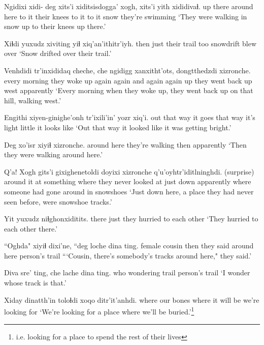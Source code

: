 \documentclass[12pt]{article}
\begin{document}
\gll Ngidixi  xidi- deg         xits'i xiditsisdogga' xogh, xits'i yith xididivaɬ.
{up there}  {}     {around here} {to it}  {their knees} {to it} {to it}  snow {they're swimming}
\glt `They were walking in snow up to their knees up there.'
\glend

\gll Xiɬdi yuxudz xiviting    yiɬ xiq'an'ithitr'iyh. 
then  just   {their trail} too {snowdrift blew over}
\glt `Snow drifted over their trail.'
\glend

\gll Venhdidi      tr'inxididaq cheche, che   ngidigg xanxitht'ots, dongtthedzdi xizronche.
{every morning} {they woke up again} {again and again}  again up      {they went back up} west  apparently
\glt `Every morning when they woke up, they went back up on that hill, walking west.'
\glend

\gll Engithi       xiyen-ginighe'onh    tr'ixili'in' yozr   xiq'i.
{out that way} {it goes that way} {it's light}   little {it looks like}
\glt `Out that way it looked like it was getting bright.'
\glend

\gll Deg         xo'isr          xiyiɬ xizronche.
{around here} {they're walking} then apparently
\glt `Then they were walking around here.'
\glend

\gll Q'a! Xogh      gits'i       gixighenetoldi       doyixi    xizronche q'u'oyhtr'iditlninghdi.
(surprise) {around it} {at something} {where they never looked at} {just down}  apparently   {where someone had gone around in snowshoes}
\glt `Just down here, a place they had never seen before, were snowshoe tracks.'
\glend

\gll Yit   yuxudz niɬghonxiditits.
there just   {they hurried to each other}
\glt `They hurried to each other there.'
\glend

\gll ``Oghda" xiyiɬ dixi'ne,  ``deg         loche dina     ting.
{female cousin}  then  {they said}  {around here}    {}   person's trail
\glt ```Cousin, there's somebody's tracks around here," they said.'
\glend

\gll Diva sre'      ting, che lache dina     ting.
who  wondering trail    {}  {}     person's trail
\glt `I wonder whose track is that.'
\glend

\gll Xiday dinatth'in toloɬdi       {xoqo ditr'it'anhdi}.
where {our bones}  {where it will be} {we're looking for}
\glt `We're looking for a place where we'll be buried.'\footnote{i.e. looking for a place to spend the rest of their lives}
\glend
\end{document}
